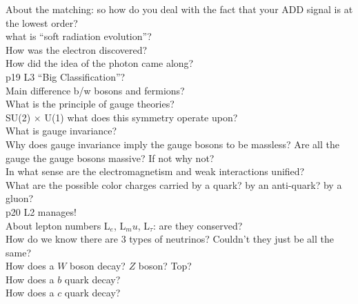 \documentclass[a4paper,10pt,twoside,notitlepage]{article}
\begin{document}
\begin{description}
\item[About the matching: so how do you deal with the fact that your ADD signal
  is at the lowest order?]

\item[what is “soft radiation evolution”?]


\item[How was the electron discovered?]

\item[How did the idea of the photon came along?]

\item[p19 L3 “Big Classification”?]

\item[Main difference b/w bosons and fermions?]

\item[What is the principle of gauge theories?]

\item[SU(2) $\times$ U(1) what does this symmetry operate upon?]

\item[What is gauge invariance?]

\item[Why does gauge invariance imply the gauge bosons to be massless? Are all
  the gauge the gauge bosons massive? If not why not?]

\item[In what sense are the electromagnetism and weak interactions unified?]

\item[What are the possible color charges carried by a quark? by an anti-quark?
  by a gluon?]

\item[p20 L2 manages!]

\item[About lepton numbers L$_e$, L$_mu$, L$_\tau$: are they conserved?]

\item[How do we know there are 3 types of neutrinos? Couldn’t they just be all
  the same?]

\item[How does a $W$ boson decay? $Z$ boson? Top?]

\item[How does a $b$ quark decay?]

\item[How does a $c$ quark decay?]


\end{description}
\end{document}
